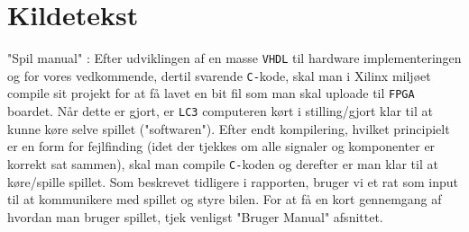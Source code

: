 \section{Kildetekst}

"Spil manual" : 
Efter udviklingen af en masse \texttt{VHDL} til hardware implementeringen og for vores vedkommende, dertil svarende \texttt{C-}kode, skal man i Xilinx miljøet compile sit projekt for at få lavet en bit fil som man skal uploade til \texttt{FPGA} boardet. Når dette er gjort, er \texttt{LC3} computeren kørt i stilling/gjort klar til at kunne køre selve spillet ("softwaren"). 
Efter endt kompilering, hvilket principielt er en form for fejlfinding (idet der tjekkes om alle signaler og komponenter er korrekt sat sammen), skal man compile \texttt{C-}koden og derefter er man klar til at køre/spille spillet. Som beskrevet tidligere i rapporten, bruger vi et rat som input til at kommunikere med spillet og styre bilen. 
For at få en kort gennemgang af hvordan man bruger spillet, tjek venligst "Bruger Manual" afsnittet.   